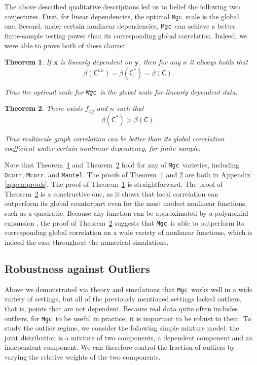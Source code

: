 \documentclass[11pt]{article}
\providecommand{\sct}[1]{{\sc \texttt{#1}}}
\providecommand{\mb}[1]{\boldsymbol{#1}}
\newcommand{\G}{\mathsf{C}}
\newcommand{\Mgc}{\sct{Mgc}}
\newcommand{\Dcorr}{\sct{Dcorr}}
\newcommand{\Mcorr}{\sct{Mcorr}}
\newcommand{\Mantel}{\sct{Mantel}}
\newtheorem{thm}{Theorem}
\begin{document}
The above described qualitative descriptions led us to belief the following two conjectures.  First, for linear dependencies,  the optimal \Mgc~scale is the global one. Second, under certain nonlinear dependencies, \Mgc~can achieve a better finite-sample testing power than its corresponding global correlation. Indeed, we were able to prove both of these claims:

\begin{thm}
\label{t:linear}
If $\mb{x}$ is linearly dependent on $\mb{y}$, then for any $n$ it always holds that
\begin{equation}
\beta(\G^{nn}) = \beta(\G^{*}) = \beta(\G).
\end{equation}

Thus the optimal scale for \Mgc~is the global scale for linearly dependent data.
\end{thm}

\begin{thm}
\label{t:non}
There exists $f_{xy}$ and $n$ such that 
\begin{equation}
\beta(\G^{*}) > \beta(\G).
\end{equation}

Thus multiscale graph correlation can be better than its global correlation coefficient under certain nonlinear dependency, for finite sample.
\end{thm}
Note that Theorem~\ref{t:linear} and Theorem~\ref{t:non} hold for any of \Mgc~varieties, including  \Dcorr, \Mcorr, and \Mantel.
% 
The proofs of Theorem~\ref{t:linear} and \ref{t:non} are both in Appendix \ref{appen:proofs}.  The proof of Theorem~\ref{t:linear} is straightforward.  The proof of Theorem~\ref{t:non} is a constructive one, as it shows that local correlation can outperform its global counterpart even for the most modest nonlinear functions, such as a quadratic.  Because any function can be approximated by a polynomial expansion \cite{RudinBook}, the proof of Theorem~\ref{t:non} suggests that \Mgc~is able to outperform its corresponding global correlation on a wide variety of nonlinear functions, which is indeed the case throughout the numerical simulations.


\subsection{Robustness against Outliers}
\label{s:outliers}

Above we demonstrated via theory and simulations that \Mgc~works well in a wide variety of settings, but all of the previously mentioned settings lacked outliers, that is, points that are not dependent.  Because real data quite often includes outliers, for \Mgc~to be useful in practice, it is important to be robust to them.
To study the outlier regime, we consider the following  simple mixture model: the joint distribution is a mixture of two components, a dependent component and an independent component.  We can therefore control the fraction of outliers by varying the relative weights of the two components.
\end{document}
